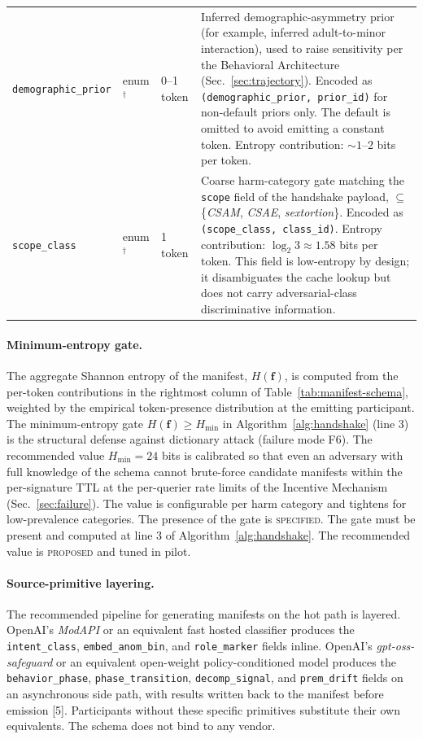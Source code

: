 \documentclass[11pt]{article}
\begin{document}
{\begin{longtable}{@{}p{2.6cm} p{1.6cm} p{1.8cm} p{8.0cm}@{}}
\texttt{demographic\_prior} & enum$^\dagger$ & 0--1 token & Inferred demographic-asymmetry prior (for example, inferred adult-to-minor interaction), used to raise sensitivity per the Behavioral Architecture (Sec.~\ref{sec:trajectory}). Encoded as \texttt{(demographic\_prior, prior\_id)} for non-default priors only. The default is omitted to avoid emitting a constant token. Entropy contribution: $\sim 1$--2 bits per token. \\

\texttt{scope\_class} & enum$^\dagger$ & 1 token & Coarse harm-category gate matching the \texttt{scope} field of the handshake payload, $\subseteq$ \{\textit{CSAM}, \textit{CSAE}, \textit{sextortion}\}. Encoded as \texttt{(scope\_class, class\_id)}. Entropy contribution: $\log_2 3 \approx 1.58$ bits per token. This field is low-entropy by design; it disambiguates the cache lookup but does not carry adversarial-class discriminative information. \\

\end{longtable}
}

\paragraph{Minimum-entropy gate.} The aggregate Shannon entropy of the manifest, $H(\mathbf{f})$, is computed from the per-token contributions in the rightmost column of Table~\ref{tab:manifest-schema}, weighted by the empirical token-presence distribution at the emitting participant. The minimum-entropy gate $H(\mathbf{f}) \geq H_{\min}$ in Algorithm~\ref{alg:handshake} (line 3) is the structural defense against dictionary attack (failure mode F6). The recommended value $H_{\min} = 24$ bits is calibrated so that even an adversary with full knowledge of the schema cannot brute-force candidate manifests within the per-signature TTL at the per-querier rate limits of the Incentive Mechanism (Sec.~\ref{sec:failure}). The value is configurable per harm category and tightens for low-prevalence categories. The presence of the gate is \textsc{specified}. The gate must be present and computed at line 3 of Algorithm~\ref{alg:handshake}. The recommended value is \textsc{proposed} and tuned in pilot.

\paragraph{Source-primitive layering.} The recommended pipeline for generating manifests on the hot path is layered. OpenAI's \emph{ModAPI} or an equivalent fast hosted classifier produces the \texttt{intent\_class}, \texttt{embed\_anom\_bin}, and \texttt{role\_marker} fields inline. OpenAI's \emph{gpt-oss-safeguard} or an equivalent open-weight policy-conditioned model produces the \texttt{behavior\_phase}, \texttt{phase\_transition}, \texttt{decomp\_signal}, and \texttt{prem\_drift} fields on an asynchronous side path, with results written back to the manifest before emission [5]. Participants without these specific primitives substitute their own equivalents. The schema does not bind to any vendor.
\end{document}
